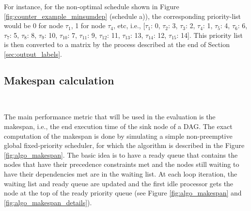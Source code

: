 For instance, for the non-optimal schedule shown in Figure \ref{fig:counter_example_minsumdep} (schedule a)),
the corresponding priority-list would be 0 for node $\tau_1$, 1 for node $\tau_4$,
etc, i.e., [$\tau_1$: 0, $\tau_2$: 3, $\tau_3$: 2, $\tau_4$: 1, $\tau_5$: 4, $\tau_6$: 6, $\tau_7$: 5, $\tau_8$: 8,
 $\tau_9$: 10, $\tau_10$: 7, $\tau_11$: 9, $\tau_12$: 11, $\tau_13$: 13, $\tau_14$: 12, $\tau_15$: 14].
This priority list is then converted to a matrix by the process described
at the end of Section \ref{sec:output_labels}.

\subsection{Makespan calculation}
~
\label{sec:makespan_calculation}

The main performance metric that will be used in the evaluation
is the makespan, i.e., the end execution time of the sink node of a DAG.
The exact computation of the makespan is done by simulating a 
simple non-preemptive global fixed-priority scheduler, for which the algorithm
is described in the Figure \ref{fig:algo_makespan}.
The basic idea is to have a ready queue that contains the nodes
that have their precedence constraints met
and the nodes still waiting to have their dependencies met 
are in the waiting list. At each loop iteration, the waiting list and ready queue
are updated and the first idle processor gets the node at the top of 
the ready priority queue (see Figure \ref{fig:algo_makespan} and \ref{fig:algo_makespan_details}).

